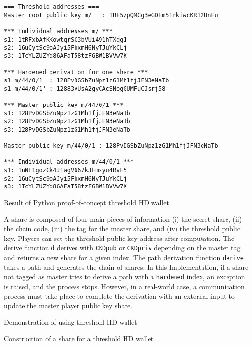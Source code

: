 \begin{listing}
  \begin{verbatim}
=== Threshold addresses ===
Master root public key m/   : 1BF5ZpQMCg3eGDEm51rkiwcKR12UnFu

*** Individual addresses m/ ***
s1: 1tRFxbAfKKowtqrSC3bVUi491hTXqg1
s2: 16uCytSc9oAJyi5FbxmH6NyTJuYkCLj
s3: 1TcYLZUZYd86AFaT58tzFGBW1BVVw7K

*** Hardened derivation for one share ***
s1 m/44/0/1  : 128PvDGSbZuNpz1zG1Mh1fjJFN3eNaTb
s1 m/44/0/1' : 12883vUsA2gyCAcSNogGUMFuCJsrj58

*** Master public key m/44/0/1 ***
s1: 128PvDGSbZuNpz1zG1Mh1fjJFN3eNaTb
s2: 128PvDGSbZuNpz1zG1Mh1fjJFN3eNaTb
s3: 128PvDGSbZuNpz1zG1Mh1fjJFN3eNaTb

Master public key m/44/0/1 : 128PvDGSbZuNpz1zG1Mh1fjJFN3eNaTb

*** Individual addresses m/44/0/1 ***
s1: 1nNL1gozCk4J1agV667kJFmsyu4RvF5
s2: 16uCytSc9oAJyi5FbxmH6NyTJuYkCLj
s3: 1TcYLZUZYd86AFaT58tzFGBW1BVVw7K
  \end{verbatim}
	\caption{Result of Python proof-of-concept threshold HD wallet}
	\label{lst:testThresholdHDMainRes}
\end{listing}

A share is composed of four main pieces of information (i) the secret share, (ii) the
chain code, (iii) the tag for the master share, and (iv) the threshold public
key. Players can set the threshold public key address after computation. The
derive function \texttt{d} derives with \texttt{CKDpub} or \texttt{CKDpriv}
depending on the master tag and returns a new share for a given index. The path
derivation function \texttt{derive} takes a path and generates the chain of
shares. In this Implementation, if a share not tagged as master tries to derive a
path with a \texttt{hardened} index, an exception is raised, and the process
stops. However, in a real-world case, a communication process must take place to
complete the derivation with an external input to update the master player public
key share.

\begin{listing}
	\caption{Demonstration of using threshold HD wallet}
	\label{lst:testThresholdHDMain}
\end{listing}

\begin{listing}
	\caption{Construction of a share for a threshold HD wallet}
	\label{lst:testThresholdHDShare}
\end{listing}


